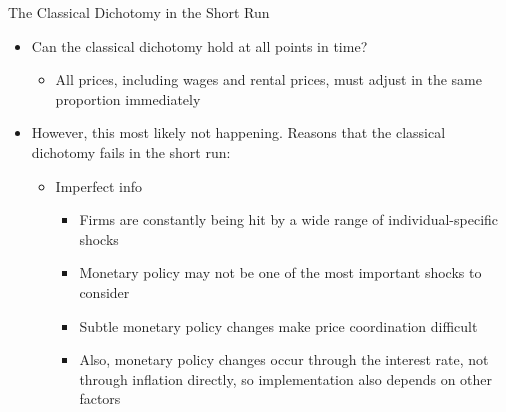 \documentclass[aspectratio=1610]{beamer}
\begin{document}
\begin{frame}[wide]{The Classical Dichotomy in the Short Run}
	\begin{itemize}
		\item Can the classical dichotomy hold at all points in time?
		\vspace{2mm}
		\begin{itemize}
			\item All prices, including wages and rental prices, must adjust in the same proportion immediately
		\end{itemize}
		\item However, this most likely not happening. Reasons that the classical dichotomy fails in the short run:
		\vspace{2mm}
		\begin{itemize}
			\item Imperfect info
			\vspace{2mm}
			\begin{itemize}
				\item Firms are constantly being hit by a wide range of individual-specific shocks
				\item Monetary policy may not be one of the most important shocks to consider
				\item Subtle monetary policy changes make price coordination difficult
				\item Also, monetary policy changes occur through the interest rate, not through inflation directly, so implementation also depends on other factors
			\end{itemize}
		\end{itemize}
	\end{itemize}
\end{frame}
\end{document}
